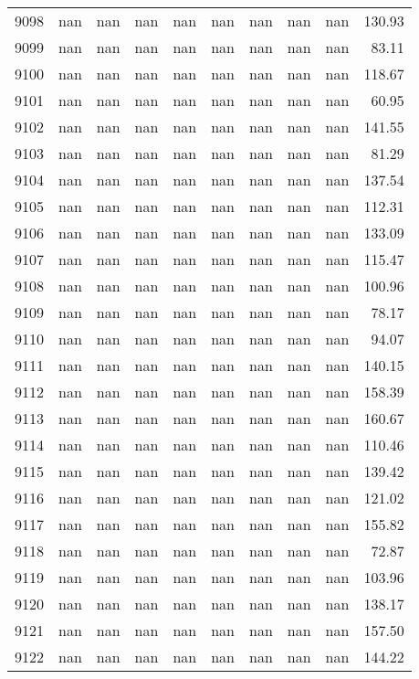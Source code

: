 \begin{tabular}{lrrrrrrrrr}
9098 & nan & nan & nan & nan & nan & nan & nan & nan & 130.93 \\
9099 & nan & nan & nan & nan & nan & nan & nan & nan & 83.11 \\
9100 & nan & nan & nan & nan & nan & nan & nan & nan & 118.67 \\
9101 & nan & nan & nan & nan & nan & nan & nan & nan & 60.95 \\
9102 & nan & nan & nan & nan & nan & nan & nan & nan & 141.55 \\
9103 & nan & nan & nan & nan & nan & nan & nan & nan & 81.29 \\
9104 & nan & nan & nan & nan & nan & nan & nan & nan & 137.54 \\
9105 & nan & nan & nan & nan & nan & nan & nan & nan & 112.31 \\
9106 & nan & nan & nan & nan & nan & nan & nan & nan & 133.09 \\
9107 & nan & nan & nan & nan & nan & nan & nan & nan & 115.47 \\
9108 & nan & nan & nan & nan & nan & nan & nan & nan & 100.96 \\
9109 & nan & nan & nan & nan & nan & nan & nan & nan & 78.17 \\
9110 & nan & nan & nan & nan & nan & nan & nan & nan & 94.07 \\
9111 & nan & nan & nan & nan & nan & nan & nan & nan & 140.15 \\
9112 & nan & nan & nan & nan & nan & nan & nan & nan & 158.39 \\
9113 & nan & nan & nan & nan & nan & nan & nan & nan & 160.67 \\
9114 & nan & nan & nan & nan & nan & nan & nan & nan & 110.46 \\
9115 & nan & nan & nan & nan & nan & nan & nan & nan & 139.42 \\
9116 & nan & nan & nan & nan & nan & nan & nan & nan & 121.02 \\
9117 & nan & nan & nan & nan & nan & nan & nan & nan & 155.82 \\
9118 & nan & nan & nan & nan & nan & nan & nan & nan & 72.87 \\
9119 & nan & nan & nan & nan & nan & nan & nan & nan & 103.96 \\
9120 & nan & nan & nan & nan & nan & nan & nan & nan & 138.17 \\
9121 & nan & nan & nan & nan & nan & nan & nan & nan & 157.50 \\
9122 & nan & nan & nan & nan & nan & nan & nan & nan & 144.22 \\

\end{tabular}
